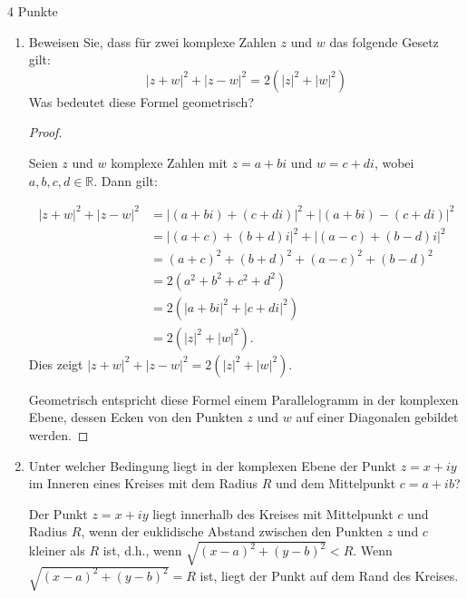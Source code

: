 \documentclass{problemset}
\begin{document}
\begin{problem}{4 Punkte}
\begin{enumerate}
    \item Beweisen Sie, dass für zwei komplexe Zahlen $z$ und $w$ das folgende Gesetz
          gilt:
          \[ |z + w|^2 + |z - w|^2 = 2(|z|^2 + |w|^2) \]
          Was bedeutet diese Formel geometrisch?

          \begin{proof}
              $ $

              Seien $z$ und $w$ komplexe Zahlen mit $z = a + bi$ und $w = c + di$, wobei $a,
                  b, c, d \in \mathbb{R}$. Dann gilt:

              \begin{align*}
                  |z + w|^2 + |z - w|^2 & = |(a + bi) + (c + di)|^2 + |(a + bi) - (c + di)|^2 \\
                                        & = |(a + c) + (b + d)i|^2 + |(a - c) + (b - d)i|^2   \\
                                        & = (a + c)^2 + (b + d)^2 + (a - c)^2 + (b - d)^2     \\
                                        & = 2(a^2 + b^2 + c^2 + d^2)                          \\
                                        & = 2(|a + bi|^2 + |c + di|^2)                        \\
                                        & = 2(|z|^2 + |w|^2).
              \end{align*}
              Dies zeigt $|z + w|^2 + |z - w|^2 = 2(|z|^2 + |w|^2)$.

              Geometrisch entspricht diese Formel einem Parallelogramm in der komplexen
              Ebene, dessen Ecken von den Punkten $z$ und $w$ auf einer Diagonalen gebildet
              werden.
          \end{proof}

    \item Unter welcher Bedingung liegt in der komplexen Ebene der Punkt $z = x + iy$ im
          Inneren eines Kreises mit dem Radius $R$ und dem Mittelpunkt $c = a + ib$?

          Der Punkt $z = x + iy$ liegt innerhalb des Kreises mit Mittelpunkt $c$ und
          Radius $R$, wenn der euklidische Abstand zwischen den Punkten $z$ und $c$
          kleiner als $R$ ist, d.h., wenn $\sqrt{(x - a)^2 + (y - b)^2} < R$. Wenn
          $\sqrt{(x - a)^2 + (y - b)^2} = R$ ist, liegt der Punkt auf dem Rand des
          Kreises.


\end{enumerate}
\end{problem}
\end{document}
